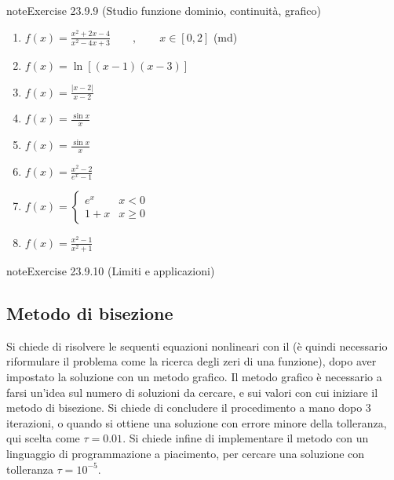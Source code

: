 \documentclass[letterpaper,10pt,italian]{jupyterBook}
\begin{document}
\begin{sphinxadmonition}{note}{Exercise 23.9.9 (Studio funzione \sphinxhyphen{} dominio, continuità, grafico)}
\begin{enumerate}
\item {} 
\sphinxAtStartPar
\(f(x) = \frac{x^2+2x-4}{x^2-4x+3} \qquad , \qquad x \in [0,2]\) (md)

\item {} 
\sphinxAtStartPar
\(f(x) = \ln \left[(x-1)(x-3)\right] \)

\item {} 
\sphinxAtStartPar
\(f(x) = \frac{|x-2|}{x-2}\)

\item {} 
\sphinxAtStartPar
\(f(x) = \frac{\sin x}{x}\)

\item {} 
\sphinxAtStartPar
\(f(x) = \frac{\sin x}{x}\)

\item {} 
\sphinxAtStartPar
\(f(x) = \frac{x^2 - 2}{e^x-1}\)

\item {} 
\sphinxAtStartPar
\(f(x) = \begin{cases} e^x & x < 0 \\ 1 + x  & x \ge 0 \end{cases}\)

\item {} 
\sphinxAtStartPar
\(f(x) = \frac{x^2 - 1}{x^2 + 1}\)

\end{enumerate}
\end{sphinxadmonition}
 \label{exercise:ch/infinitesimal_calculus/analysis-problems-exercise-9}

\begin{sphinxadmonition}{note}{Exercise 23.9.10 (Limiti e applicazioni)}




\end{sphinxadmonition}


\subsection{Metodo di bisezione}
\label{\detokenize{ch/infinitesimal_calculus/analysis-problems:metodo-di-bisezione}}\label{\detokenize{ch/infinitesimal_calculus/analysis-problems:infinitesimal-calculus-analysis-problems-bisection}}
\sphinxAtStartPar
Si chiede di risolvere le sequenti equazioni nonlineari con il  (è quindi necessario riformulare il problema come la ricerca degli zeri di una funzione), dopo aver impostato la soluzione con un metodo grafico. Il metodo grafico è necessario a farsi un’idea sul numero di soluzioni da cercare, e sui valori con cui iniziare il metodo di bisezione. Si chiede di concludere il procedimento a mano dopo 3 iterazioni, o quando si ottiene una soluzione con errore minore della tolleranza, qui scelta come \(\tau = 0.01\). Si chiede infine di implementare il metodo con un linguaggio di programmazione a piacimento, per cercare una soluzione con tolleranza \(\tau = 10^{-5}\).
\end{document}
